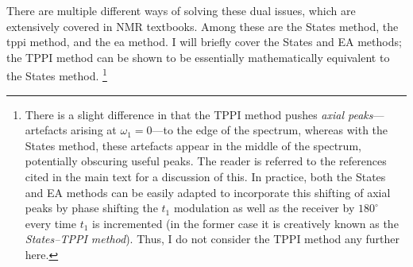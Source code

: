 There are multiple different ways of solving these dual issues, which are extensively covered in NMR textbooks.\autocite{Ernst1987,Keeler2010,Levitt2008,Claridge2016,Cavanagh2007}
Among these are the States method\autocite{States1982JMR}, the \ac{tppi} method\autocite{Marion1983BBRC}, and the \ac{ea} method.
I will briefly cover the States and EA methods; the TPPI method can be shown to be essentially mathematically equivalent to the States method\autocite{Keeler1985JMR}.%
\footnote{There is a slight difference in that the TPPI method pushes \textit{axial peaks}---artefacts arising at $\omega_1 = 0$---to the edge of the spectrum, whereas with the States method, these artefacts appear in the middle of the spectrum, potentially obscuring useful peaks. The reader is referred to the references cited in the main text for a discussion of this.
In practice, both the States and EA methods can be easily adapted to incorporate this shifting of axial peaks by phase shifting the $t_1$ modulation as well as the receiver by $180^\circ$ every time $t_1$ is incremented (in the former case it is creatively known as the \textit{States--TPPI method}).
Thus, I do not consider the TPPI method any further here.}

